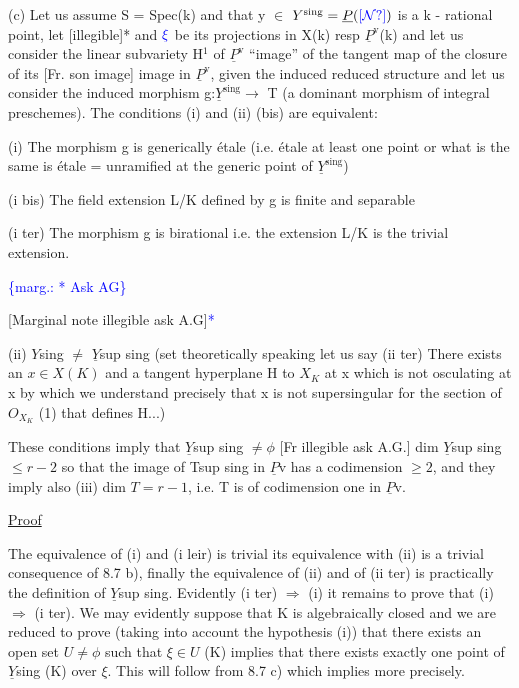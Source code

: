 \documentclass[11pt]{article}
\newcommand{\scanpage}[1]{\par\bigskip\noindent{\small\sffamily[scan #1]}\par}
\newcommand{\mspage}[1]{{\small\sffamily[p.\,#1]}}
\newcommand{\hand}[1]{\textcolor{blue}{#1}}
\newcommand{\margin}[1]{\textcolor{blue}{\{\textsf{marg.:} #1\}}}
\newcommand{\uline}[1]{\underline{#1}}
\newcommand{\unsure}[1]{[#1?]}
\begin{document}
(c) Let us assume S = Spec(k) and that y $\in$ $Y^{\mathrm{sing}} = \underline{P}(\hand{\unsure{\mathcal{N}}})$ is
a k - rational point, let [illegible]* and $\hand{\xi}$ be its projections in
X(k) resp $\underline{P}^{\mathrm{v}}$(k) and let us consider the linear subvariety H$^1$ of $\underline{P}^{\mathrm{v}}$
``image'' of the tangent map of the closure of its [Fr. son image]
image in $\underline{P}^{\mathrm{v}}$, given the induced reduced structure and let us
consider the induced morphism g:$\underline{Y}^{\mathrm{sing}} \rightarrow$ T (a dominant morphism of
integral preschemes). The conditions (i) and (ii) (bis) are
equivalent:

(i) The morphism g is generically étale (i.e. étale at least
one point or what is the same is étale = unramified at the generic
point of $\underline{Y}^{\mathrm{sing}}$)

(i bis) The field extension L/K defined by g is finite and
separable

(i ter) The morphism g is birational i.e. the extension L/K
is the trivial extension.

\margin{* Ask AG}

\clearpage
\scanpage{24/49}
\mspage{49}

[Marginal note illegible ask A.G]\hand{*}

(ii) $Y$sing $\neq$ $\underline{Y}$sup sing (set theoretically speaking let us say
(ii ter) There exists an $x \in X(K)$ and a tangent hyperplane H to $X_{K}$
at x which is not osculating at x by which we understand precisely
that x is not supersingular for the section of $O_{X_{K}}$ (1) that defines
H...)

These conditions imply that $\underline{Y}$sup sing $\neq \phi$ [Fr illegible ask
A.G.] dim $\underline{Y}$sup sing $\leq r - 2$ so that the image of Tsup sing in $\underline{P}$v has a
codimension $\geq 2$, and they imply also (iii) dim $T = r - 1$, i.e. T
is of codimension one in $\underline{P}$v.

\uline{Proof}

The equivalence of (i) and (i leir) is trivial its
equivalence with (ii) is a trivial consequence of 8.7 b), finally
the equivalence of (ii) and of (ii ter) is practically the
definition of $\underline{Y}$sup sing. Evidently (i ter) $\Rightarrow$ (i) it remains to
prove that (i) $\Rightarrow$ (i ter). We may evidently suppose that K is
algebraically closed and we are reduced to prove (taking into
account the hypothesis (i)) that there exists an open set $U \neq \phi$
such that $\xi \in U$ (K) implies that there exists exactly one point of
$\underline{Y}$sing (K) over $\xi$. This will follow from 8.7 c) which implies more
precisely.
\end{document}
